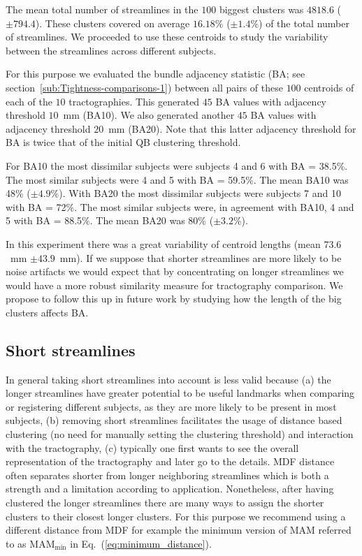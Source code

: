 \documentclass{bioinfo}
\begin{document}
The mean total number of streamlines in the $100$ biggest clusters was
$\num{4818.6}$ ($\pm \num{794.4}$). These clusters covered on average
$16.18\%$ ($\pm\num{1.4}\%$) of the total number of streamlines. We
proceeded to use these centroids to study the variability between the
streamlines across different subjects.

For this purpose we evaluated the bundle adjacency statistic (BA; see
section~\ref{sub:Tightness-comparisons-1}) between all pairs of these
$100$ centroids of each of the $10$ tractographies. This generated $45$
BA values with adjacency threshold $10$~mm (BA10). We also generated
another $45$ BA values with adjacency threshold $20$~mm (BA20). Note
that this latter adjacency threshold for BA is twice that of the initial
QB clustering threshold.

For BA10 the most dissimilar subjects were subjects 4 and 6 with BA =
38.5\%. The most similar subjects were 4 and 5 with BA = 59.5\%. The
mean BA10 was 48\% ($\pm\num{4.9}$\%). With BA20 the most dissimilar
subjects were subjects 7 and 10 with BA = 72\%. The most similar
subjects were, in agreement with BA10, 4 and 5 with BA = 88.5\%. The
mean BA20 was 80\% ($\pm\num{3.2}$\%).

In this experiment there was a great variability of centroid lengths
(mean $73.6$~mm $\pm\num{43.9}$~mm). If we suppose that shorter
streamlines are more likely to be noise artifacts we would expect that
by concentrating on longer streamlines we would have a more robust
similarity measure for tractography comparison. We propose to follow
this up in future work by studying how the length of the big clusters
affects BA.

\subsection{Short streamlines\label{sub:short_tracks}}

In general taking short streamlines into account is less valid because
(a) the longer streamlines have greater potential to be useful landmarks
when comparing or registering different subjects, as they are more
likely to be present in most subjects, (b) removing short streamlines
facilitates the usage of distance based clustering (no need for manually
setting the clustering threshold) and interaction with the tractography,
(c) typically one first wants to see the overall representation of the
tractography and later go to the details. MDF distance often separates
shorter from longer neighboring streamlines which is both a strength and
a limitation according to application. Nonetheless, after having
clustered the longer streamlines there are many ways to assign the
shorter clusters to their closest longer clusters. For this purpose we
recommend using a different distance from MDF for example the minimum
version of MAM referred to as $\textrm{MAM}_{\textrm{min}}$ in
Eq.~(\ref{eq:minimum_distance}).
\end{document}
